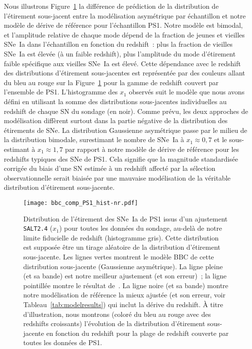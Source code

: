 \documentclass[../main/main.tex]{subfiles}
\begin{document}
Nous illustrons Figure~\ref{fig:bbc_pdf_ps1} la différence de prédiction de la
distribution de l'étirement sous-jacent entre la modélisation asymétrique par
échantillon et notre modèle de dérive de référence pour l'échantillon PS1. Notre
modèle est bimodal, et l'amplitude relative de chaque mode dépend de la fraction
de jeunes et vieilles SNe~Ia dans l'échantillon en fonction du redshift~: plus
la fraction de vieilles SNe~Ia est élevée (à un faible redshift), plus
l'amplitude du mode d'étirement faible spécifique aux vieilles SNe~Ia est élevé.
Cette dépendance avec le redshift des distributions d'étirement sous-jacentes
est représentée par des couleurs allant du bleu au rouge sur la
Figure~\ref{fig:bbc_pdf_ps1} pour la gamme de redshift couvert par l'ensemble de
PS1. L'histogramme des $x_1$ observés suit le modèle que nous avons défini en
utilisant la somme des distributions sous-jacentes individuelles au redshift de
chaque SN du sondage (en noir). Comme prévu, les deux approches de modélisation
diffèrent surtout dans la partie négative de la distribution des étirements de
SNe. La distribution Gaussienne asymétrique passe par le milieu de la
distribution bimodale, surestimant le nombre de SNe~Ia à $x_1 \approx 0,7$ et
le sous-estimant à $x_1 \approx 1,7$ par rapport à notre modèle de dérive de
référence pour les redshifts typiques des SNe de PS1. Cela signifie que la
magnitude standardisée corrigée du biais d'une SN estimée à un redshift affecté
par la sélection observationnelle serait biaisée par une mauvaise modélisation
de la véritable distribution d'étirement sous-jacente.

\begin{figure}
    \centering
    \texttt{[image: bbc\_comp\_PS1\_hist-nr.pdf]}
    \caption[Comparaison des modélisations de BBC et de notre modèle de
    référence sur l'histogramme des étirements de PS1.]{Distribution de
        l'étirement des SNe~Ia de PS1 issus d'un ajustement \texttt{SALT2.4}
        ($x_1$) pour toutes les données du sondage, au-delà de notre limite
        fiducielle de redshift (histogramme gris). Cette distribution est
        supposée être un tirage aléatoire de la distribution d'étirement
        sous-jacente. Les lignes vertes montrent le modèle BBC de cette
        distribution sous-jacente (Gaussienne asymétrique). La ligne pleine (et
        sa bande) est notre meilleur ajustement (et son erreur)~; la ligne
        pointillée montre le résultat de~\cite{scolnic2018}. La ligne noire (et
        sa bande) montre notre modélisation de référence la mieux ajustée (et
        son erreur, voir Tableau~\ref{tab:modelresults}) qui inclut la dérive du
        redshift. À titre d'illustration, nous montrons (coloré du bleu au rouge
        avec des redshifts croissants) l'évolution de la distribution
        d'étirement sous-jacente en fonction du redshift pour la plage de
    redshift couverte par toutes les données de PS1.}
    \label{fig:bbc_pdf_ps1}
\end{figure}
\end{document}
